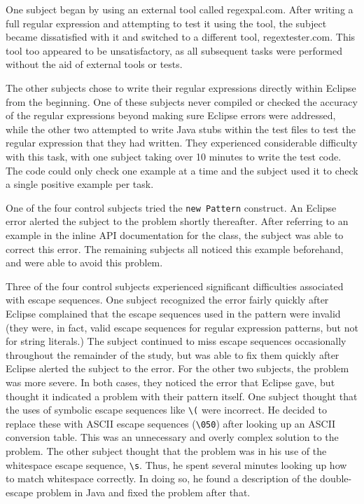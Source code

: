 \documentclass[10pt, conference, compsocconf]{IEEEtran}
\begin{document}
One subject began by using an external tool called regexpal.com. After writing a full regular expression and attempting to test it using the tool, the subject became dissatisfied with it and switched to a different tool, regextester.com. This tool too appeared to be unsatisfactory, as all subsequent tasks were performed without the aid of external tools or tests.

The other subjects chose to write their regular expressions directly within Eclipse from the beginning. One of these subjects never compiled or checked the accuracy of the regular expressions beyond making sure Eclipse errors were addressed, while the other two attempted to write Java stubs within the test files to test the regular expression that they had written. They experienced considerable difficulty with this task, with one subject taking over 10 minutes to write the test code. The code could only check one example at a time and the subject used it to check a single positive example per task.

One of the four control subjects tried the \verb|new Pattern| construct. An Eclipse error alerted the subject to the problem shortly thereafter. After referring to an example in the inline API documentation for the class, the subject was able to correct this error. The remaining subjects all noticed this example beforehand, and were able to avoid this problem.

Three of the four control subjects experienced significant difficulties associated with escape sequences. One subject recognized the error fairly quickly after Eclipse complained that the escape sequences used in the pattern were invalid (they were, in fact, valid escape sequences for regular expression patterns, but not for string literals.) The subject continued to miss escape sequences occasionally throughout the remainder of the study, but was able to fix them quickly after Eclipse alerted the subject to the error. For the other two subjects, the problem was more severe. In both cases, they noticed the error that Eclipse gave, but thought it indicated a problem with their pattern itself. One subject thought that the uses of symbolic escape sequences like \verb|\(| were incorrect. He decided to replace these with ASCII escape sequences (\verb|\050|) after looking up an ASCII conversion table. This was an unnecessary and overly complex solution to the problem. The other subject thought that the problem was in his use of the whitespace escape sequence, \verb|\s|. Thus, he  spent several minutes looking up how to match whitespace correctly. In doing so, he found a description of the double-escape problem in Java and fixed the problem after that.
\end{document}
